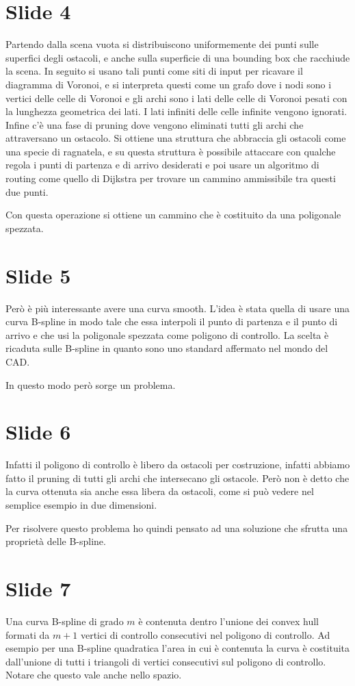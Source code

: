 \documentclass{article}
\begin{document}
\section*{Slide 4}
Partendo dalla scena vuota si distribuiscono uniformemente dei punti
sulle superfici degli ostacoli, e anche sulla superficie di una
bounding box che racchiude la scena. In seguito si usano tali punti
come siti di input per ricavare il diagramma di Voronoi, e si
interpreta questi come un grafo dove i nodi sono i vertici delle celle
di Voronoi e gli archi sono i lati delle celle di Voronoi pesati con
la lunghezza geometrica dei lati. I lati infiniti delle celle infinite
vengono ignorati. Infine c'è una fase di pruning dove vengono
eliminati tutti gli archi che attraversano un ostacolo. Si ottiene una
struttura che abbraccia gli ostacoli come una specie di ragnatela, e
su questa struttura è possibile attaccare con qualche regola i punti
di partenza e di arrivo desiderati e poi usare un algoritmo di routing
come quello di Dijkstra per trovare un cammino ammissibile tra questi
due punti.

Con questa operazione si ottiene un cammino che è costituito da una
poligonale spezzata.

\section*{Slide 5}
Però è più interessante avere una curva smooth. L'idea è stata quella
di usare una curva B-spline in modo tale che essa interpoli il punto
di partenza e il punto di arrivo e che usi la poligonale spezzata come
poligono di controllo. La scelta è ricaduta sulle B-spline in quanto
sono uno standard affermato nel mondo del CAD.

In questo modo però sorge un problema.

\section*{Slide 6}
Infatti il poligono di controllo è libero da ostacoli per costruzione,
infatti abbiamo fatto il pruning di tutti gli archi che intersecano
gli ostacole. Però non è detto che la curva ottenuta sia anche essa
libera da ostacoli, come si può vedere nel semplice esempio in due
dimensioni.

Per risolvere questo problema ho quindi pensato ad una soluzione che
sfrutta una proprietà delle B-spline.

\section*{Slide 7}
Una curva B-spline di grado $m$ è contenuta dentro l'unione dei convex
hull formati da $m+1$ vertici di controllo consecutivi nel poligono di
controllo. Ad esempio per una B-spline quadratica l'area in cui è
contenuta la curva è costituita dall'unione di tutti i triangoli di
vertici consecutivi sul poligono di controllo. Notare che questo vale
anche nello spazio.
\end{document}

